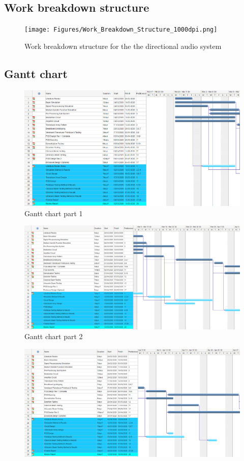 \begin{appendices}
\subsection{Work breakdown structure}
\begin{figure}[ht]
    \centering
    \texttt{[image: Figures/Work\_Breakdown\_Structure\_1000dpi.png]}
    \caption{Work breakdown structure for the the directional audio system}
    \label{fig:wbs}
\end{figure}
\newpage
\subsection{Gantt chart}
\begin{figure}[ht]
    \centering
    \includegraphics[width=\textwidth]{Figures/Gantt1.PNG}
    \caption{Gantt chart part 1}
    \label{fig:gantt1}
\end{figure}
\begin{figure}[ht]
    \centering
    \includegraphics[width=\textwidth]{Figures/Gantt2.PNG}
    \caption{Gantt chart part 2}
    \label{fig:gantt2}
\end{figure}
\begin{figure}[ht]
    \centering
    \includegraphics[width=\textwidth]{Figures/Gantt3.PNG}

\end{figure}
\end{appendices}
